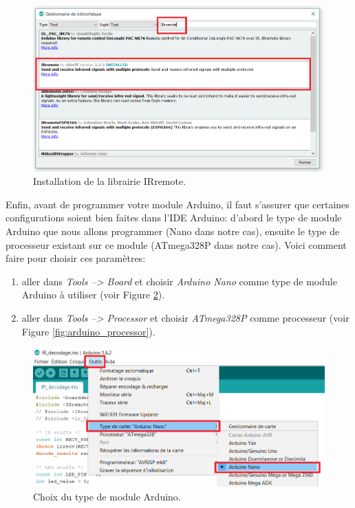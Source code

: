 \begin{figure}[ht!]
	\centering
	\includegraphics[width=\textwidth]{imgs/arduino_IRremote.png}
	\caption{Installation de la librairie IRremote.}
	\label{fig:arduino_IRremote}
\end{figure}

Enfin, avant de programmer votre module Arduino, il faut s'assurer que certaines configurations soient bien faites dans l'IDE Arduino: d'abord le type de module Arduino que nous allons programmer (Nano dans notre cas), ensuite le type de processeur existant sur ce module (ATmega328P dans notre cas). Voici comment faire pour choisir ces paramètres:
\begin{enumerate}
	\item aller dans \textit{Tools --> Board} et choisir \textit{Arduino Nano} comme type de module Arduino à utiliser (voir Figure \ref{fig:arduino_board}).
	\item aller dans \textit{Tools --> Processor} et choisir \textit{ATmega328P} comme processeur (voir Figure \ref{fig:arduino_processor}).
\end{enumerate}

\begin{figure}[ht!]
	\centering
	\includegraphics[width=\textwidth]{imgs/arduino_board_v2.png}
	\caption{Choix du type de module Arduino.}
	\label{fig:arduino_board}
\end{figure}


